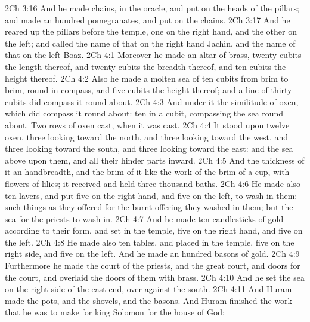\vs 2Ch 3:16 And he made chains,  in the oracle, and put  on the heads of the pillars; and made an hundred pomegranates, and put  on the chains.
\vs 2Ch 3:17 And he reared up the pillars before the temple, one on the right hand, and the other on the left; and called the name of that on the right hand Jachin, and the name of that on the left Boaz.
\vs 2Ch 4:1 Moreover he made an altar of brass, twenty cubits the length thereof, and twenty cubits the breadth thereof, and ten cubits the height thereof.
\vs 2Ch 4:2 Also he made a molten sea of ten cubits from brim to brim, round in compass, and five cubits the height thereof; and a line of thirty cubits did compass it round about.
\vs 2Ch 4:3 And under it  the similitude of oxen, which did compass it round about: ten in a cubit, compassing the sea round about. Two rows of oxen  cast, when it was cast.
\vs 2Ch 4:4 It stood upon twelve oxen, three looking toward the north, and three looking toward the west, and three looking toward the south, and three looking toward the east: and the sea  above upon them, and all their hinder parts  inward.
\vs 2Ch 4:5 And the thickness of it  an handbreadth, and the brim of it like the work of the brim of a cup, with flowers of lilies;  it received and held three thousand baths.
\vs 2Ch 4:6 He made also ten lavers, and put five on the right hand, and five on the left, to wash in them: such things as they offered for the burnt offering they washed in them; but the sea  for the priests to wash in.
\vs 2Ch 4:7 And he made ten candlesticks of gold according to their form, and set  in the temple, five on the right hand, and five on the left.
\vs 2Ch 4:8 He made also ten tables, and placed  in the temple, five on the right side, and five on the left. And he made an hundred basons of gold.
\vs 2Ch 4:9 Furthermore he made the court of the priests, and the great court, and doors for the court, and overlaid the doors of them with brass.
\vs 2Ch 4:10 And he set the sea on the right side of the east end, over against the south.
\vs 2Ch 4:11 And Huram made the pots, and the shovels, and the basons. And Huram finished the work that he was to make for king Solomon for the house of God;

